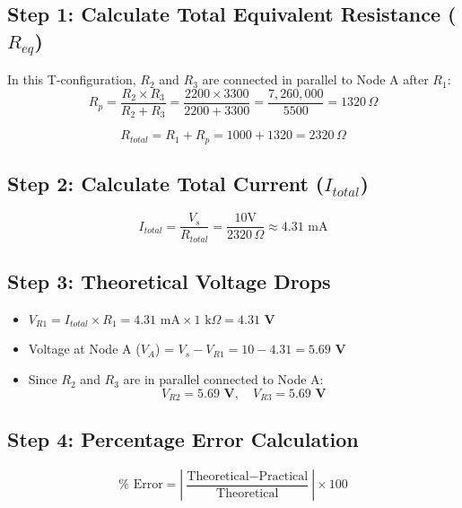 \subsection{Step 1: Calculate Total Equivalent Resistance (\texorpdfstring{$R_{eq}$}{Req})}
In this T-configuration, $R_2$ and $R_3$ are connected in parallel to Node A after $R_1$:
\begin{equation}
    R_p = \frac{R_2 \times R_3}{R_2 + R_3} = \frac{2200 \times 3300}{2200 + 3300} = \frac{7,260,000}{5500} = 1320\,\Omega
\end{equation}

\begin{equation}
    R_{total} = R_1 + R_p = 1000 + 1320 = 2320\,\Omega
\end{equation}

\subsection{Step 2: Calculate Total Current (\texorpdfstring{$I_{total}$}{Itotal})}
\begin{equation}
    I_{total} = \frac{V_s}{R_{total}} = \frac{10\text{V}}{2320\,\Omega} \approx 4.31\text{ mA}
\end{equation}

\subsection{Step 3: Theoretical Voltage Drops}
\begin{itemize}
    \item $V_{R1} = I_{total} \times R_1 = 4.31\text{ mA} \times 1\text{ k}\Omega = \mathbf{4.31\text{ V}}$
    \item Voltage at Node A ($V_A$) = $V_s - V_{R1} = 10 - 4.31 = \mathbf{5.69\text{ V}}$
    \item Since $R_2$ and $R_3$ are in parallel connected to Node A:
    \begin{equation*}
        V_{R2} = \mathbf{5.69\text{ V}}, \quad V_{R3} = \mathbf{5.69\text{ V}}
    \end{equation*}
\end{itemize}

\subsection{Step 4: Percentage Error Calculation}
\begin{equation}
    \% \text{ Error} = \left| \frac{\text{Theoretical} - \text{Practical}}{\text{Theoretical}} \right| \times 100
\end{equation}

